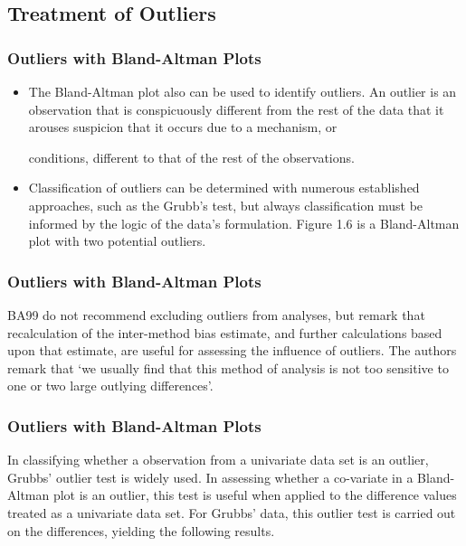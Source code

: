 \documentclass[compress]{beamer}        %
\begin{document}
\subsection{Treatment of Outliers}
\begin{frame}
\frametitle{Outliers with Bland-Altman Plots}
\begin{itemize}
\item The Bland-Altman plot also can be used to identify outliers. An
outlier is an observation that is conspicuously different from the
rest of the data that it arouses suspicion that it occurs due to a
mechanism, or 

conditions, different to that of the rest of the
observations. 
\item Classification of outliers can be determined with
numerous established approaches, such as the Grubb's test, but
always classification must be informed by the logic of the data's
formulation. Figure 1.6 is a Bland-Altman plot with two potential
outliers.
\end{itemize}




\end{frame}
\begin{frame}
\frametitle{Outliers with Bland-Altman Plots}
\alert{BA99} do not recommend excluding outliers from analyses,
but remark that recalculation of the inter-method bias estimate,
and further calculations based upon that estimate, are useful for
assessing the influence of outliers. The authors remark that `we
usually find that this method of analysis is not too sensitive to
one or two large outlying differences'.

\end{frame}
\begin{frame}
\frametitle{Outliers with Bland-Altman Plots}

In classifying whether a observation from a univariate data set is
an outlier, Grubbs' outlier test is widely used. In assessing
whether a co-variate in a Bland-Altman plot is an outlier, this
test is useful when applied to the difference values treated as a
univariate data set. For Grubbs' data, this outlier test is
carried out on the differences, yielding the following results.
\end{frame}
\end{document}
